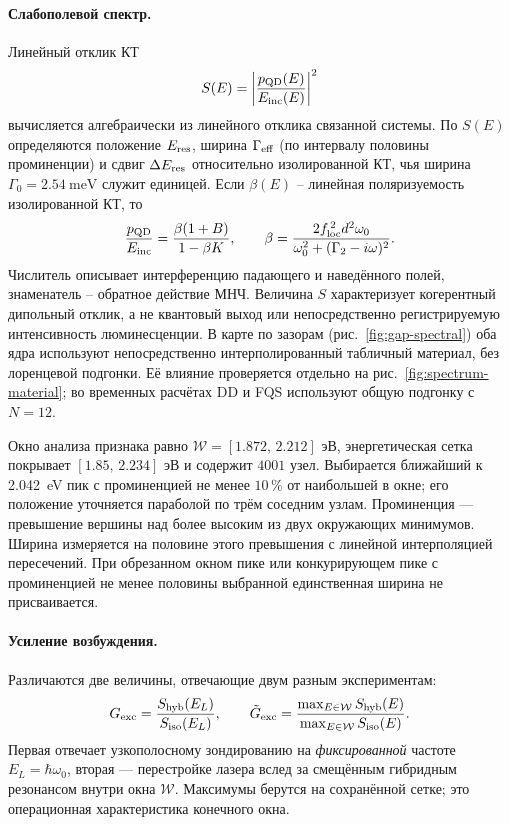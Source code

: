 \paragraph{Слабополевой спектр.} Линейный отклик КТ
\begin{equation}
  S(E) = \left|\frac{p_{\rm QD}(E)}{E_{\rm inc}(E)}\right|^2
  \label{eq:S}
\end{equation}
вычисляется алгебраически из линейного отклика связанной системы. По $S(E)$
определяются положение $E_{\rm res}$, ширина $\Gamma_{\rm eff}$ (по интервалу
половины проминенции) и сдвиг $\Delta E_{\rm res}$ относительно изолированной
КТ, чья ширина $\Gamma_0=\SI{2.54}{\milli\electronvolt}$ служит единицей.
Если $\beta(E)$ -- линейная поляризуемость изолированной КТ, то
\begin{equation}
  \frac{p_{\rm QD}}{E_{\rm inc}}
  = \frac{\beta(1+B)}{1-\beta K},
  \qquad
  \beta=\frac{2f_{\rm loc}^{\,2}d^2\omega_0}
  {\omega_0^2+(\Gamma_2-i\omega)^2}.
  \label{eq:linear-qd}
\end{equation}
Числитель описывает интерференцию падающего и наведённого полей,
знаменатель -- обратное действие МНЧ. Величина $S$ характеризует
когерентный дипольный отклик, а не квантовый выход или непосредственно
регистрируемую интенсивность люминесценции.
В карте по зазорам (рис.~\ref{fig:gap-spectral}) оба ядра используют
непосредственно интерполированный табличный материал, без лоренцевой
подгонки. Её влияние проверяется отдельно на рис.~\ref{fig:spectrum-material};
во временных расчётах DD и FQS используют общую подгонку с $N=12$.

Окно анализа признака равно $\mathcal W=[1.872,\,2.212]$ эВ,
энергетическая сетка покрывает $[1.85,\,2.234]$ эВ и содержит $4001$ узел.
Выбирается ближайший к \SI{2.042}{\electronvolt} пик с проминенцией
не менее $10\,\%$ от наибольшей в окне; его положение уточняется
параболой по трём соседним узлам. Проминенция --- превышение вершины
над более высоким из двух окружающих минимумов. Ширина измеряется
на половине этого превышения с линейной интерполяцией пересечений.
При обрезанном окном пике или конкурирующем пике с проминенцией
не менее половины выбранной единственная ширина не присваивается.

\paragraph{Усиление возбуждения.} Различаются две величины, отвечающие двум
разным экспериментам:
\begin{equation}
  G_{\rm exc} = \frac{S_{\rm hyb}(E_L)}{S_{\rm iso}(E_L)},
  \qquad
  \tilde G_{\rm exc} = \frac{\max_{E\in\mathcal W} S_{\rm hyb}(E)}
                            {\max_{E\in\mathcal W} S_{\rm iso}(E)}.
  \label{eq:gain}
\end{equation}
Первая отвечает узкополосному зондированию на \emph{фиксированной} частоте
$E_L=\hbar\omega_0$, вторая — перестройке лазера вслед за смещённым гибридным
резонансом внутри окна $\mathcal W$. Максимумы берутся на сохранённой
сетке; это операционная характеристика конечного окна.

